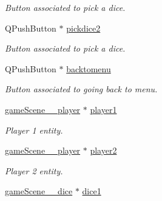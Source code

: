 \begin{DoxyCompactItemize}
\begin{DoxyCompactList}\small\item\em Button associated to pick a dice. \end{DoxyCompactList}\item 
\hypertarget{classgameScene__1_ac63326cdde9d41719b9ba82fb59334e1}{Q\-Push\-Button $\ast$ \hyperlink{classgameScene__1_ac63326cdde9d41719b9ba82fb59334e1}{pickdice2}}\label{classgameScene__1_ac63326cdde9d41719b9ba82fb59334e1}

\begin{DoxyCompactList}\small\item\em Button associated to pick a dice. \end{DoxyCompactList}\item 
\hypertarget{classgameScene__1_a74a5926e9e78fb930ac2869324926a81}{Q\-Push\-Button $\ast$ \hyperlink{classgameScene__1_a74a5926e9e78fb930ac2869324926a81}{backtomenu}}\label{classgameScene__1_a74a5926e9e78fb930ac2869324926a81}

\begin{DoxyCompactList}\small\item\em Button associated to going back to menu. \end{DoxyCompactList}\item 
\hypertarget{classgameScene__1_a5b2cd8aaf5732ae2c8e587813eb64a0c}{\hyperlink{classgameScene__1__player}{game\-Scene\-\_\-\_\-player} $\ast$ \hyperlink{classgameScene__1_a5b2cd8aaf5732ae2c8e587813eb64a0c}{player1}}\label{classgameScene__1_a5b2cd8aaf5732ae2c8e587813eb64a0c}

\begin{DoxyCompactList}\small\item\em Player 1 entity. \end{DoxyCompactList}\item 
\hypertarget{classgameScene__1_ac0b6333d2bf88765a03ef745c56dbf92}{\hyperlink{classgameScene__1__player}{game\-Scene\-\_\-\_\-player} $\ast$ \hyperlink{classgameScene__1_ac0b6333d2bf88765a03ef745c56dbf92}{player2}}\label{classgameScene__1_ac0b6333d2bf88765a03ef745c56dbf92}

\begin{DoxyCompactList}\small\item\em Player 2 entity. \end{DoxyCompactList}\item 
\hypertarget{classgameScene__1_a18fa27a2b5a5634bf1306862ba4dc7c7}{\hyperlink{classgameScene__1__dice}{game\-Scene\-\_\-\_\-dice} $\ast$ \hyperlink{classgameScene__1_a18fa27a2b5a5634bf1306862ba4dc7c7}{dice1}}\label{classgameScene__1_a18fa27a2b5a5634bf1306862ba4dc7c7}


\end{DoxyCompactItemize}
